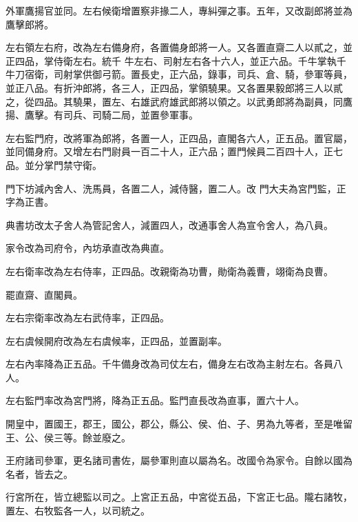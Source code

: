 \begin{pinyinscope}
 外軍鷹揚官並同。左右候衛增置察非掾二人，專糾彈之事。五年，又改副郎將並為鷹擊郎將。



 左右領左右府，改為左右備身府，各置備身郎將一人。又各置直齋二人以貳之，並正四品，掌侍衛左右。統千
 牛左右、司射左右各十六人，並正六品。千牛掌執千牛刀宿衛，司射掌供御弓箭。置長史，正六品，錄事，司兵、倉、騎，參軍等員，並正八品。有折沖郎將，各三人，正四品，掌領驍果。又各置果毅郎將三人以貳之，從四品。其驍果，置左、右雄武府雄武郎將以領之。以武勇郎將為副員，同鷹揚、鷹擊。有司兵、司騎二局，並置參軍事。



 左右監門府，改將軍為郎將，各置一人，正四品，直閣各六人，正五品。置官屬，並同備身府。又增左右門尉員一百二十人，正六品；置門候員二百四十人，正七品。並分掌門禁守衛。



 門下坊減內舍人、洗馬員，各置二人，減侍醫，置二人。改
 門大夫為宮門監，正字為正書。



 典書坊改太子舍人為管記舍人，減置四人，改通事舍人為宣令舍人，為八員。



 家令改為司府令，內坊承直改為典直。



 左右衛率改為左右侍率，正四品。改親衛為功曹，勛衛為義曹，翊衛為良曹。



 罷直齋、直閣員。



 左右宗衛率改為左右武侍率，正四品。



 左右虞候開府改為左右虞候率，正四品，並置副率。



 左右內率降為正五品。千牛備身改為司仗左右，備身左右改為主射左右。各員八人。



 左右監門率改為宮門將，降為正五品。監門直長改為直事，置六十人。



 開皇中，置國王，郡王，國公，郡公，縣公、侯、伯、子、男為九等者，至是唯留王、公、侯三等。餘並廢之。



 王府諸司參軍，更名諸司書佐，屬參軍則直以屬為名。改國令為家令。自餘以國為名者，皆去之。



 行宮所在，皆立總監以司之。上宮正五品，中宮從五品，下宮正七品。隴右諸牧，置左、右牧監各一人，以司統之。




\end{pinyinscope}
